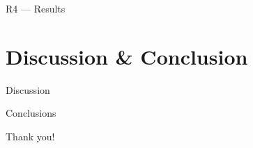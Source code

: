 \documentclass[12pt,aspectratio=169]{beamer}
\begin{document}
\begin{frame}{R4 --- Results}

\end{frame}

\section{Discussion \& Conclusion}

\begin{frame}{Discussion}

\end{frame}

\begin{frame}{Conclusions}
 
\end{frame}

\begin{frame}[plain,c]
  \centering
  {\Huge Thank you!}
\end{frame}


\appendix
\end{document}
